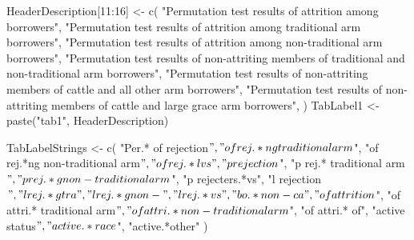 \begin{Schunk}
\begin{Sinput}
HeaderDescription[11:16] <- c(
   "Permutation test results of attrition among borrowers", 
     "Permutation test results of attrition among traditional arm borrowers",
     "Permutation test results of attrition among non-traditional arm borrowers",
     "Permutation test results of non-attriting members of traditional and non-traditional arm borrowers",
     "Permutation test results of non-attriting members of cattle and all other arm borrowers",
     "Permutation test results of non-attriting members of cattle and large grace arm borrowers",
    )
TabLabel1 <- paste("tab1", HeaderDescription)
% TabLabelStrings is from RejectionTestsMainText4.rnw 
% I will modify the table headers for survival/surviving members to "non-attriting borrowers"
%   "survival$", "surviving.*race$", "surv.*other"
\end{Sinput}
\end{Schunk}
\begin{Schunk}
\begin{Sinput}
TabLabelStrings <- 
c(
  "Per.* of rejection$", "of rej.*ng traditional arm$", "of rej.*ng non-traditional arm$", 
  "of rej.*l vs", "p rejection$", "p rej.* traditional arm$", 
  "p rej.*g non-traditional arm$", "p rejecters.*vs", "l rejection$", 
  "l rej.*g tra",  "l rej.*g non-", "l rej.*vs", 
  "bo.*non-ca", 
  "of attrition$", "of attri.* traditional arm$", 
  "of attri.* non-traditional arm$", "of attri.* of",
  "active status$", "active.*race$", "active.*other"
  )
\end{Sinput}
\end{Schunk}


